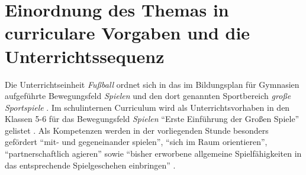 

\section{Einordnung des Themas in curriculare Vorgaben und die Unterrichtssequenz}

Die Unterrichtseinheit \emph{Fußball} ordnet sich in das im Bildungsplan für
Gymnasien aufgeführte Bewegungsfeld \emph{Spielen} und den dort genannten
Sportbereich \emph{große Sportspiele} \cite[S.
10]{dersenatorfurbildungundwissenschaft2006a}. Im schulinternen Curriculum wird
als Unterrichtsvorhaben in den Klassen 5-6 für das Bewegungsfeld \emph{Spielen}
\enquote{Erste Einführung der Großen Spiele} gelistet \cite[S.
2]{kippenberg-gymnasiumbremen2011}. Als Kompetenzen werden in der vorliegenden
Stunde besonders gefördert \enquote{mit- und gegeneinander spielen},
\enquote{sich im Raum orientieren}, \enquote{partnerschaftlich agieren} sowie
\enquote{bisher erworbene allgemeine Spielfähigkeiten in das entsprechende
Spielgeschehen einbringen} \cite[S.
11]{dersenatorfurbildungundwissenschaft2006a}.

